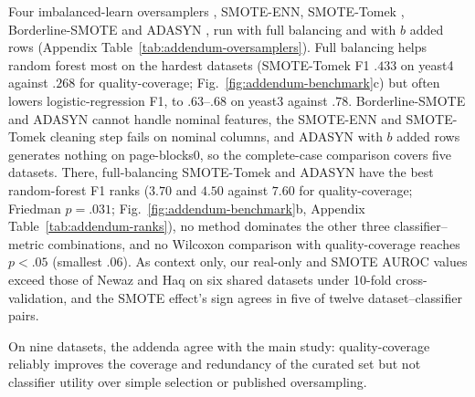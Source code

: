 Four imbalanced-learn oversamplers \cite{lemaitre2017imbalanced}, SMOTE-ENN, SMOTE-Tomek \cite{batista2004study}, Borderline-SMOTE \cite{han2005borderline} and ADASYN \cite{he2008adasyn}, run with full balancing and with $b$ added rows (Appendix Table~\ref{tab:addendum-oversamplers}). Full balancing helps random forest most on the hardest datasets (SMOTE-Tomek F1 $.433$ on yeast4 against $.268$ for quality-coverage; Fig.~\ref{fig:addendum-benchmark}c) but often lowers logistic-regression F1, to $.63$--$.68$ on yeast3 against $.78$. Borderline-SMOTE and ADASYN cannot handle nominal features, the SMOTE-ENN and SMOTE-Tomek cleaning step fails on nominal columns, and ADASYN with $b$ added rows generates nothing on page-blocks0, so the complete-case comparison covers five datasets. There, full-balancing SMOTE-Tomek and ADASYN have the best random-forest F1 ranks ($3.70$ and $4.50$ against $7.60$ for quality-coverage; Friedman $p=.031$; Fig.~\ref{fig:addendum-benchmark}b, Appendix Table~\ref{tab:addendum-ranks}), no method dominates the other three classifier--metric combinations, and no Wilcoxon comparison with quality-coverage reaches $p<.05$ (smallest $.06$). As context only, our real-only and SMOTE AUROC values exceed those of Newaz and Haq \cite{newaz2022hybrid} on six shared datasets under 10-fold cross-validation, and the SMOTE effect's sign agrees in five of twelve dataset--classifier pairs.

On nine datasets, the addenda agree with the main study: quality-coverage reliably improves the coverage and redundancy of the curated set but not classifier utility over simple selection or published oversampling.
